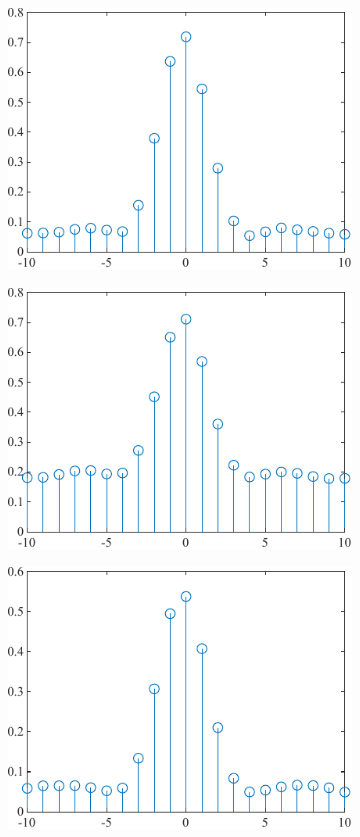 \begin{figure}
\centering
\begin{subfigure}{.5\textwidth}
  \centering
  \includegraphics[width=0.8\linewidth]{4-ANC_Sys/CrossCorrelation 30.pdf}
  \caption{}
  \label{fig_CrossCorrelation30}
\end{subfigure}%
\begin{subfigure}{.5\textwidth}
  \centering
  \includegraphics[width=0.8\linewidth]{4-ANC_Sys/CrossCorrelation 32.pdf}
  \caption{}
  \label{fig_CrossCorrelation32}
\end{subfigure}
\begin{subfigure}{.5\textwidth}
  \centering
  \includegraphics[width=0.8\linewidth]{4-ANC_Sys/CrossCorrelation 35.pdf}

\end{subfigure}
\end{figure}
